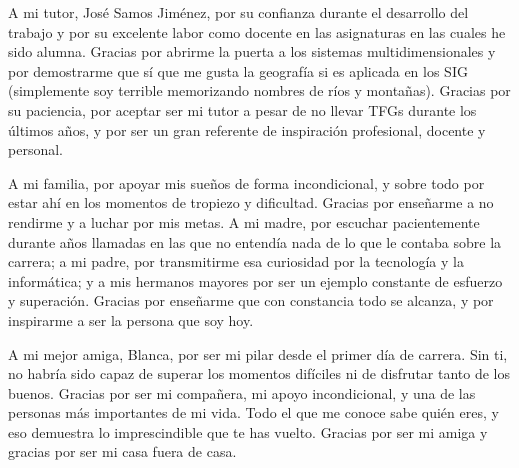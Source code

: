 A mi tutor, José Samos Jiménez, por su confianza durante el desarrollo del trabajo y por su excelente labor como docente en las asignaturas en las cuales he sido alumna. Gracias por abrirme la puerta a los sistemas multidimensionales y por demostrarme que sí que me gusta la geografía si es aplicada en los SIG (simplemente soy terrible memorizando nombres de ríos y montañas). Gracias por su paciencia, por aceptar ser mi tutor a pesar de no llevar TFGs durante los últimos años, y por ser un gran referente de inspiración profesional, docente y personal.

A mi familia, por apoyar mis sueños de forma incondicional, y sobre todo por estar ahí en los momentos de tropiezo y dificultad. Gracias por enseñarme a no rendirme y a luchar por mis metas. A mi madre, por escuchar pacientemente durante años llamadas en las que no entendía nada de lo que le contaba sobre la carrera; a mi padre, por transmitirme esa curiosidad por la tecnología y la informática; y a mis hermanos mayores por ser un ejemplo constante de esfuerzo y superación. Gracias por enseñarme que con constancia todo se alcanza, y por inspirarme a ser la persona que soy hoy.

A mi mejor amiga, Blanca, por ser mi pilar desde el primer día de carrera. Sin ti, no habría sido capaz de superar los momentos difíciles ni de disfrutar tanto de los buenos. Gracias por ser mi compañera, mi apoyo incondicional, y una de las personas más importantes de mi vida. Todo el que me conoce sabe quién eres, y eso demuestra lo imprescindible que te has vuelto. Gracias por ser mi amiga y gracias por ser mi casa fuera de casa.